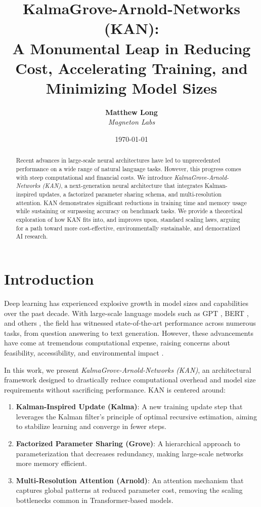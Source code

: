 \documentclass{article}
\title{KalmaGrove-Arnold-Networks (KAN): \\
A Monumental Leap in Reducing Cost, Accelerating Training, and Minimizing Model Sizes}
\author{
  \textbf{Matthew Long}\\
  \textit{Magneton Labs}
}
\date{\today}
\begin{document}
\maketitle

\begin{abstract}
Recent advances in large-scale neural architectures have led to unprecedented performance on a wide range of natural language tasks. However, this progress comes with steep computational and financial costs. We introduce \emph{KalmaGrove-Arnold-Networks (KAN)}, a next-generation neural architecture that integrates Kalman-inspired updates, a factorized parameter sharing schema, and multi-resolution attention. KAN demonstrates significant reductions in training time and memory usage while sustaining or surpassing accuracy on benchmark tasks. We provide a theoretical exploration of how KAN fits into, and improves upon, standard scaling laws, arguing for a path toward more cost-effective, environmentally sustainable, and democratized AI research.
\end{abstract}

\section{Introduction}
\label{sec:introduction}

Deep learning has experienced explosive growth in model sizes and capabilities over the past decade. With large-scale language models such as GPT \citep{gpt}, BERT \citep{bert}, and others \citep{brown2020language, chowdhery2022palm}, the field has witnessed state-of-the-art performance across numerous tasks, from question answering to text generation. However, these advancements have come at tremendous computational expense, raising concerns about feasibility, accessibility, and environmental impact \citep{strubell2019energy}.

In this work, we present \emph{KalmaGrove-Arnold-Networks (KAN)}, an architectural framework designed to drastically reduce computational overhead and model size requirements without sacrificing performance. KAN is centered around:
\begin{enumerate}
    \item \textbf{Kalman-Inspired Update (Kalma)}: A new training update step that leverages the Kalman filter's principle of optimal recursive estimation, aiming to stabilize learning and converge in fewer steps.
    \item \textbf{Factorized Parameter Sharing (Grove)}: A hierarchical approach to parameterization that decreases redundancy, making large-scale networks more memory efficient.
    \item \textbf{Multi-Resolution Attention (Arnold)}: An attention mechanism that captures global patterns at reduced parameter cost, removing the scaling bottlenecks common in Transformer-based models.
\end{enumerate}
\end{document}
